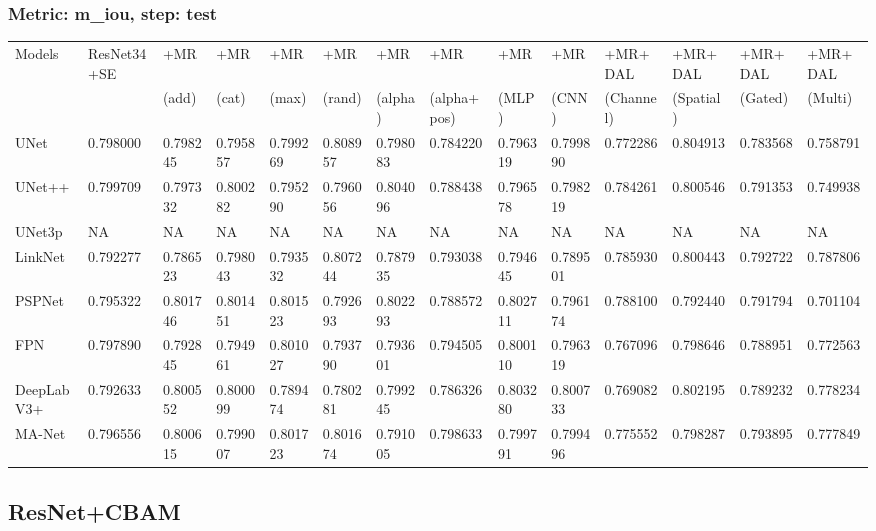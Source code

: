 \documentclass{article}
\begin{document}
\subsubsection{Metric: m\_iou, step: test}
\begin{tabular}{llllllllllllll}
\toprule
Models & ResNet34+SE & +MR  & +MR  & +MR  & +MR  & +MR  & +MR  & +MR  & +MR  & +MR+DAL & +MR+DAL & +MR+DAL & +MR+DAL \\
       &             &  (add) &  (cat) &  (max) &  (rand) &  (alpha) &  (alpha+pos) &  (MLP) &  (CNN) & (Channel) & (Spatial) & (Gated) & (Multi) \\
\midrule
UNet & 0.798000 & 0.798245 & 0.795857 & 0.799269 & 0.808957 & 0.798083 & 0.784220 & 0.796319 & 0.799890 & 0.772286 & 0.804913 & 0.783568 & 0.758791 \\
UNet++ & 0.799709 & 0.797332 & 0.800282 & 0.795290 & 0.796056 & 0.804096 & 0.788438 & 0.796578 & 0.798219 & 0.784261 & 0.800546 & 0.791353 & 0.749938 \\
UNet3p & NA & NA & NA & NA & NA & NA & NA & NA & NA & NA & NA & NA & NA \\
LinkNet & 0.792277 & 0.786523 & 0.798043 & 0.793532 & 0.807244 & 0.787935 & 0.793038 & 0.794645 & 0.789501 & 0.785930 & 0.800443 & 0.792722 & 0.787806 \\
PSPNet & 0.795322 & 0.801746 & 0.801451 & 0.801523 & 0.792693 & 0.802293 & 0.788572 & 0.802711 & 0.796174 & 0.788100 & 0.792440 & 0.791794 & 0.701104 \\
FPN & 0.797890 & 0.792845 & 0.794961 & 0.801027 & 0.793790 & 0.793601 & 0.794505 & 0.800110 & 0.796319 & 0.767096 & 0.798646 & 0.788951 & 0.772563 \\
DeepLabV3+ & 0.792633 & 0.800552 & 0.800099 & 0.789474 & 0.780281 & 0.799245 & 0.786326 & 0.803280 & 0.800733 & 0.769082 & 0.802195 & 0.789232 & 0.778234 \\
MA-Net & 0.796556 & 0.800615 & 0.799007 & 0.801723 & 0.801674 & 0.791005 & 0.798633 & 0.799791 & 0.799496 & 0.775552 & 0.798287 & 0.793895 & 0.777849 \\
\bottomrule
\end{tabular}

\subsection{ResNet+CBAM}
\end{document}
